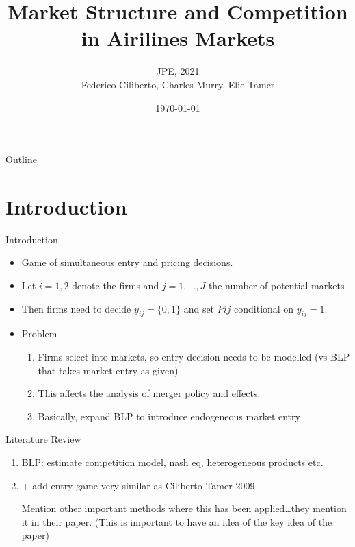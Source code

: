 \documentclass{beamer}
\title[CMT (2021)]{Market Structure and Competition in Airilines Markets}
\author[Zafar, Wiswall]{JPE, 2021 \\Federico Ciliberto, Charles Murry, Elie Tamer}
\date{\today}
\begin{document}
\begin{frame}
    \titlepage
\end{frame}

\begin{frame}{Outline}
    \tableofcontents
\end{frame}

\section{Introduction}

\begin{frame}{Introduction}
    \begin{itemize}
        This is a sketch...
        \item Game of simultaneous entry and pricing decisions. 
        \item Let $i=1,2$ denote the firms and $j=1, ..., J$ the number of potential markets 
        \item Then firms need to decide $y_{ij}=\{0,1\}$ and set $P{ij}$ conditional on $y_{ij}=1$.
        \item Problem \rightarrow 
        \begin{enumerate}
            \item Firms select into markets, so entry decision needs to be modelled (vs BLP that takes market entry as given)
            \item This affects the analysis of merger policy and effects.
            \item Basically, expand BLP to introduce endogeneous market entry
        \end{enumerate}
    \end{itemize}
\end{frame}

\begin{frame}{Literature Review}
\begin{enumerate}
    \item BLP: estimate competition model, nash eq, heterogeneous products etc. 
    \item + add entry game very similar as Ciliberto Tamer 2009
    
    Mention other important methods where this has been applied\dots they mention it in their paper. 
    (This is important to have an idea of the key idea of the paper)
\end{enumerate}
    
\end{frame}
\end{document}
